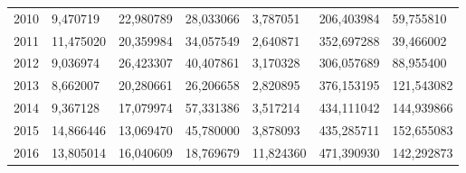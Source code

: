 \begin{table}
\begin{tabular}{p{1cm}p{2cm}p{2cm}p{2cm}p{2cm}p{2cm}p{2cm}}
 2010 &                                           9,470719 &                  22,980789 & 28,033066 &                         3,787051 &                     206,403984 &         59,755810 \\
 2011 &                                          11,475020 &                  20,359984 & 34,057549 &                         2,640871 &                     352,697288 &         39,466002 \\
 2012 &                                           9,036974 &                  26,423307 & 40,407861 &                         3,170328 &                     306,057689 &         88,955400 \\
 2013 &                                           8,662007 &                  20,280661 & 26,206658 &                         2,820895 &                     376,153195 &        121,543082 \\
 2014 &                                           9,367128 &                  17,079974 & 57,331386 &                         3,517214 &                     434,111042 &        144,939866 \\
 2015 &                                          14,866446 &                  13,069470 & 45,780000 &                         3,878093 &                     435,285711 &        152,655083 \\
 2016 &                                          13,805014 &                  16,040609 & 18,769679 &                        11,824360 &                     471,390930 &        142,292873 \\
\bottomrule
\end{tabular}
\end{table}
